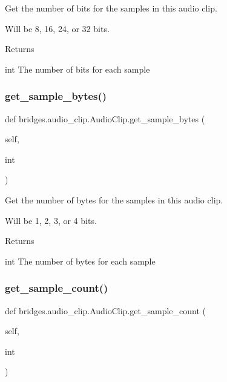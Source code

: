 Get the number of bits for the samples in this audio clip. 

Will be 8, 16, 24, or 32 bits. \begin{DoxyReturn}{Returns}


int The number of bits for each sample 
\end{DoxyReturn}
\mbox{\label{classbridges_1_1audio__clip_1_1_audio_clip_a0e7b9cf8f6c59f5b402048e64925f204}} 
\subsubsection{\texorpdfstring{get\+\_\+sample\+\_\+bytes()}{get\_sample\_bytes()}}
{\footnotesize\ttfamily def bridges.\+audio\+\_\+clip.\+Audio\+Clip.\+get\+\_\+sample\+\_\+bytes (\begin{DoxyParamCaption}\item[{}]{self,  }\item[{}]{int }\end{DoxyParamCaption})}



Get the number of bytes for the samples in this audio clip. 

Will be 1, 2, 3, or 4 bits. \begin{DoxyReturn}{Returns}


int The number of bytes for each sample 
\end{DoxyReturn}
\mbox{\label{classbridges_1_1audio__clip_1_1_audio_clip_ace0227160e6743e8fd19c803af81d474}} 
\subsubsection{\texorpdfstring{get\+\_\+sample\+\_\+count()}{get\_sample\_count()}}
{\footnotesize\ttfamily def bridges.\+audio\+\_\+clip.\+Audio\+Clip.\+get\+\_\+sample\+\_\+count (\begin{DoxyParamCaption}\item[{}]{self,  }\item[{}]{int }\end{DoxyParamCaption})}

